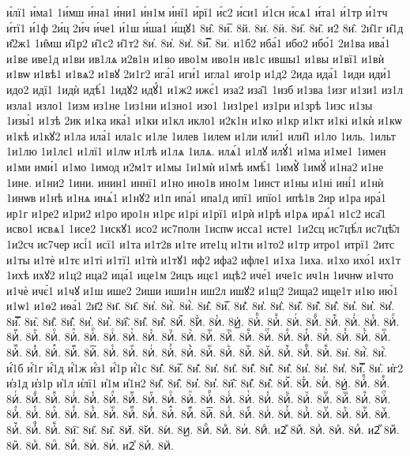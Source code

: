 {и́лї1
и́ма1
1и́мш
и́на1
и́ни1
и́н1м
и́нї1
и́рї1
и́с2
и́си1
и́1сн
и́сѧ1
и́та1
и́1тр
и́1тч
и́тї1
и́1ф
2и́ц
2и́ч
и́че1
и́1ш
и́ша1
и́щꙋ1
8и̂.
8и̅.
8й.
8и̇.
8ӥ.
8и̋.
8и̏.
и2̑
8и̑.
2и̑1г
и̑1д
и̑2ж1
1и̑мш
и̑1р2
и̑1с2
и̑1т2
8и̓.
8и̔.
8и̾.
8и̿.
8и͘.
и1б2
иба́1
ибо2
ибо́1
2и1ва
ива́1
и1ве
иве1д
и1ви
ив1лѧ
и2в1н
и1во
иво1м
иво1н
ив1с
ившы1
и1вы
и1вї1
и1вѝ
и1вѡ
и1вѣ1
и1вѧ2
и1вꙋ
2и1г2
ига́1
иги́1
игла1
иго1р
и1д2
2ида
ида́1
1иди
иди́1
идо2
идї1
1идѝ
идѣ́1
1идꙋ2
идꙋ́1
и1ж2
ижє́1
иза2
иза̑1
1изб
и1зва
1изг
и1зи1
из1л
изла1
изло1
1изм
из1не
1из1ни
и1зно1
изо1
1из1ре1
из1ри
и1зрѣ
1изс
и1зы
1изы́1
и1зѣ
2ик
и1ка
ика́1
и1ки
и1кл
икло1
и2к1н
и1ко
и1кр
и1кт
и1кі
и1кѝ
и1кѡ
и1кѣ
и1кꙋ2
и1ла
ила́1
ила1с
и1ле
1илев
1илем
и1ли
или́1
или̑1
и1ло
1иль.
1ильт
1и1лю
1и1лє1
и1лї1
и1лѡ
и1лѣ
и1лѧ
1илѧ.
илѧ́1
и1лꙋ
илꙋ́1
и1ма
и1ме1
1имен
и1ми
ими́1
и1мо
1имод
и2м1т
и1мы
1и1мѝ
и1мѣ
имѣ́1
1имꙋ̀
1имꙋ́
и1на2
и1не
1ине.
и1ни2
1ини.
инин1
иннї1
и1но
ино1в
ино1м
1инст
и1ны
и1ні
ині́1
и1нѝ
1инѡв
и1нѣ
и1нѧ
инѧ́1
и1нꙋ2
и1п
ипа́1
ипа1д
ипї1
ипїо1
ипѣ1в
2ир
и1ра
ира́1
ир1г
и1ре2
и1ри2
и1ро
иро1н
и1рє
и1рі
и1рї1
и1рѝ
и1рѣ
и1рѧ
ирѧ́1
и1с2
иса̑1
исво1
исвѧ1
1исе2
1искꙋ1
исо2
ис7полн
1испѡ
исса1
исте1
1и2сц
ис7цѣ́л
ис7цѣ̑л
1и2сч
ис7чер
исі́1
исї1
и1та
и1т2в
и1те
ите1ц
и1ти
и1то2
и1тр
итро1
итрї1
2итс
и1ты
и1тѐ
и1тє
и1ті
и1тї1
и1тѝ
и1тꙋ1
иф2
ифа2
ифле1
и1ха
1иха.
и1хо
ихо́1
их1т
1ихѣ
ихꙋ2
и1ц2
ица2
ица́1
ице1м
2ицъ
ицє1
ицѣ2
иче́1
иче1с
ич1н
1ичнѡ
и1что
и1чѐ
ичє́1
и1чꙋ
и1ш
ише2
2иши
иши1н
иш2л
ишꙋ2
и1щ2
2ища2
ище1т
и1ю
ию́1
и1ѡ1
и1ѳ2
иѳа́1
2и҃2
8и҃.
8и҄.
8и҅.
8и҅̀.
8и҅́.
8и҅̂.
8и҅̅.
8и҅̆.
8и҅̇.
8и҅̈.
8и҅̋.
8и҅̏.
8и҅̑.
8и҅̓.
8и҅̔.
8и҅̾.
8и҅̿.
8и҅͘.
8и҅҃.
8и҅҄.
8и҅҅.
8и҅҆.
8и҅҇.
8и҅᷀.
8и҅᷁.
8и҅᷶.
8и᷷҅.
8и᷸҅.
8и᷹҅.
8и҅ⷠ.
8и҅ⷡ.
8и҅ⷢ.
8и҅ⷣ.
8и҅ⷤ.
8и҅ⷥ.
8и҅ⷦ.
8и҅ⷧ.
8и҅ⷨ.
8и҅ⷩ.
8и҅ⷪ.
8и҅ⷫ.
8и҅ⷬ.
8и҅ⷭ.
8и҅ⷮ.
8и҅ⷯ.
8и҅ⷰ.
8и҅ⷱ.
8и҅ⷲ.
8и҅ⷳ.
8и҅ⷴ.
8и҅ⷵ.
8и҅ⷶ.
8и҅ⷷ.
8и҅ⷸ.
8и҅ⷹ.
8и҅ⷺ.
8и҅ⷻ.
8и҅ⷼ.
8и҅ⷽ.
8и҅ⷾ.
8и҅ⷿ.
8и҅꙯.
8и҅ꙴ.
8и҅ꙵ.
8и҅ꙶ.
8и҅ꙷ.
8и҅ꙸ.
8и҅ꙹ.
8и҅ꙺ.
8и҅ꙻ.
8и҅꙼.
8и҅꙽.
8и҅ꚞ.
8и҅ꚟ.
8и҆.
8и҆̀.
8и҆́.
и҆́1б
и҆́1г
и҆́1д
и҆́1ж
и҆́з1
и҆́1р
и҆́1с
8и҆̂.
8и҆̅.
8и҆̆.
8и҆̇.
8и҆̈.
8и҆̋.
8и҆̏.
8и҆̑.
8и҆̓.
8и҆̔.
8и҆̾.
8и҆̿.
8и҆͘.
и҆г2
и҆з1д
и҆з1р
и҆1л
и҆лї1
и҆1м
и҆1н2
8и҆҃.
8и҆҄.
8и҆҅.
8и҆҆.
8и҆҇.
8и҆᷀.
8и҆᷁.
8и҆᷶.
8и᷷҆.
8и᷸҆.
8и᷹҆.
8и҆ⷠ.
8и҆ⷡ.
8и҆ⷢ.
8и҆ⷣ.
8и҆ⷤ.
8и҆ⷥ.
8и҆ⷦ.
8и҆ⷧ.
8и҆ⷨ.
8и҆ⷩ.
8и҆ⷪ.
8и҆ⷫ.
8и҆ⷬ.
8и҆ⷭ.
8и҆ⷮ.
8и҆ⷯ.
8и҆ⷰ.
8и҆ⷱ.
8и҆ⷲ.
8и҆ⷳ.
8и҆ⷴ.
8и҆ⷵ.
8и҆ⷶ.
8и҆ⷷ.
8и҆ⷸ.
8и҆ⷹ.
8и҆ⷺ.
8и҆ⷻ.
8и҆ⷼ.
8и҆ⷽ.
8и҆ⷾ.
8и҆ⷿ.
8и҆꙯.
8и҆ꙴ.
8и҆ꙵ.
8и҆ꙶ.
8и҆ꙷ.
8и҆ꙸ.
8и҆ꙹ.
8и҆ꙺ.
8и҆ꙻ.
8и҆꙼.
8и҆꙽.
8и҆ꚞ.
8и҆ꚟ.
8и҇.
8и᷀.
8и᷁.
8и᷶.
8и᷷.
8и᷸.
8и᷹.
8иⷠ.
8иⷡ.
8иⷢ.
8иⷣ.
и2ⷤ
8иⷤ.
8иⷥ.
8иⷦ.
8иⷧ.
и2ⷨ
8иⷨ.
8иⷩ.
8иⷪ.
8иⷫ.
8иⷬ.
8иⷭ.
8иⷮ.
и2ⷯ
8иⷯ.
8иⷰ.
}
